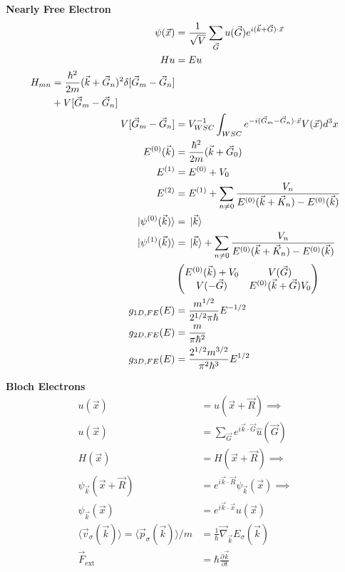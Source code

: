 \documentclass[12pt]{article}
\begin{document}
\begin{multicols}{2}
\noindent
\textbf{Nearly Free Electron}
\begin{align}
  \psi(\vec{x}) &= \frac{1}{\sqrt{V}}\sum_{\vec{G}} u(\vec{G}) e^{i(\vec{k} + \vec{G}) \cdot \vec{x}}\\
  Hu &= Eu\\
  \begin{split}
    H_{mn} &= \frac{\hbar^2}{2m}(\vec{k} + \vec{G}_n)^2 \delta[\vec{G}_m - \vec{G}_n]\\
    &+ V[\vec{G}_m - \vec{G}_n] %
  \end{split}\\
  V[\vec{G}_m - \vec{G}_n] &= V_{WSC}^{-1} \int_{WSC} e^{-i(\vec{G}_m - \vec{G}_n) \cdot \vec{x}} V(\vec{x}) d^3x \\
  E^{(0)}(\vec{k}) &= \frac{\hbar^2}{2m}(\vec{k} + \vec{G}_0)\\
  E^{(1)} &= E^{(0)} + V_0\\
  E^{(2)} &= E^{(1)} + \sum_{n \neq 0} \frac{V_n}{E^{(0)}(\vec{k} + \vec{K}_n) - E^{(0)}(\vec{k})}\\
  \ket*{\psi^{(0)}(\vec{k})} &= \ket*{\vec{k}}\\
  \ket*{\psi^{(1)}(\vec{k})} &= \ket*{\vec{k}} + \sum_{n \neq 0} \frac{V_n}{E^{(0)}(\vec{k} + \vec{K}_n) - E^{(0)}(\vec{k})}\\
  &\begin{pmatrix}E^{(0)}(\vec{k}) + V_0 & V(\vec{G})\\V(-\vec{G}) & E^{(0)}(\vec{k} + \vec{G}) V_0\end{pmatrix}\\
  g_{1D,FE}(E) &= \frac{m^{1/2}}{2^{1/2}\pi\hbar}E^{-1/2}\\
  g_{2D,FE}(E) &= \frac{m}{\pi\hbar^2}\\
  g_{3D,FE}(E) &= \frac{2^{1/2}m^{3/2}}{\pi^2\hbar^3}E^{1/2}
\end{align}

\noindent
\textbf{Bloch Electrons}
\begin{align}
  u(\vec{x}) &= u(\vec{x} + \vec{R}) \implies\\
  u(\vec{x}) &= \sum_{\vec{G}}e^{i\vec{k} \cdot \vec{G}} \hat{u}(\vec{G})\\
  H(\vec{x}) &= H(\vec{x} + \vec{R}) \implies\\
  \psi_{\vec{k}}(\vec{x} + \vec{R}) &= e^{i\vec{k} \cdot \vec{R}} \psi_{\vec{k}}(\vec{x})  \implies\\
  \psi_{\vec{k}}(\vec{x}) &= e^{i\vec{k} \cdot \vec{x}}u(\vec{x})\\
  \langle \vec{v}_{\sigma}(\vec{k})\rangle = \langle \vec{p}_{\sigma}(\vec{k})\rangle/m &= \frac{1}{\hbar} \vec{\nabla}_{\vec{k}} E_{\sigma}(\vec{k})\\ %
  \vec{F}_{\textrm{ext}} &= \hbar \frac{\partial \vec{k}}{\partial t} %
\end{align}


\end{multicols}
\end{document}

